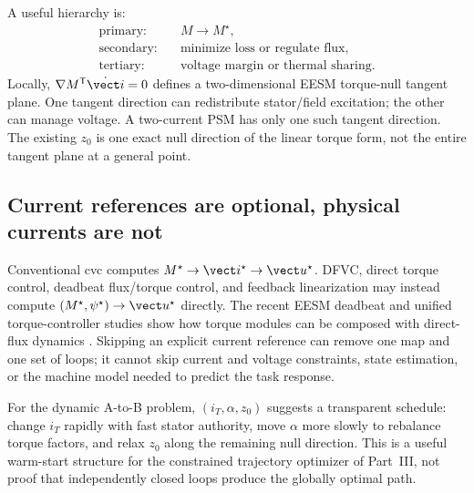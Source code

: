 A useful hierarchy is:
\begin{align*}
 \text{primary:}&\quad M\to M^\star,\\
 \text{secondary:}&\quad \text{minimize loss or regulate flux},\\
 \text{tertiary:}&\quad \text{voltage margin or thermal sharing}.
\end{align*}
Locally, \(\nabla M^{\mathsf T}\dot{\vect i}=0\) defines a two-dimensional
EESM torque-null tangent plane. One tangent direction can redistribute
stator/field excitation; the other can manage voltage. A two-current PSM has
only one such tangent direction. The existing \(z_0\) is one exact null
direction of the linear torque form, not the entire tangent plane at a general
point.



\subsection{Current references are optional, physical currents are not}

Conventional \gls{cvc} computes
\(M^\star\to\vect i^\star\to\vect u^\star\). DFVC, direct torque control,
deadbeat flux/torque control, and feedback linearization may instead compute
\((M^\star,\psi^\star)\to\vect u^\star\) directly. The recent EESM deadbeat and
unified torque-controller studies show how torque modules can be composed with
direct-flux dynamics \cite{rubino2026deadbeat,ionta2026unified}. Skipping an
explicit current reference can remove one map and one set of loops; it cannot
skip current and voltage constraints, state estimation, or the machine model
needed to predict the task response.

For the dynamic A-to-B problem, \((i_T,\alpha,z_0)\) suggests a transparent
schedule: change \(i_T\) rapidly with fast stator authority, move \(\alpha\)
more slowly to rebalance torque factors, and relax \(z_0\) along the remaining
null direction. This is a useful warm-start structure for the constrained
trajectory optimizer of Part~III, not proof that independently closed loops
produce the globally optimal path.
